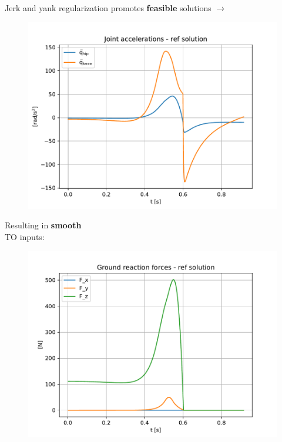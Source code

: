 \documentclass[aspectratio=169]{beamer}
\begin{document}
\begin{frame}
\begin{multicols}{2}
Jerk and yank regularization promotes \textbf{feasible} solutions $\rightarrow$
\vspace{0.3cm}
\begin{figure}
\includegraphics[width=1.0\columnwidth]{beamer_imgs/optimal_jumping_traj/ref/acc.pdf}
\end{figure}
\columnbreak
Resulting in \textbf{smooth}\\ TO inputs:
\begin{figure}
\includegraphics[width=1.0\columnwidth]{beamer_imgs/optimal_jumping_traj/ref/grf.pdf}
\end{figure}
\end{multicols}
\end{frame}
\end{document}
